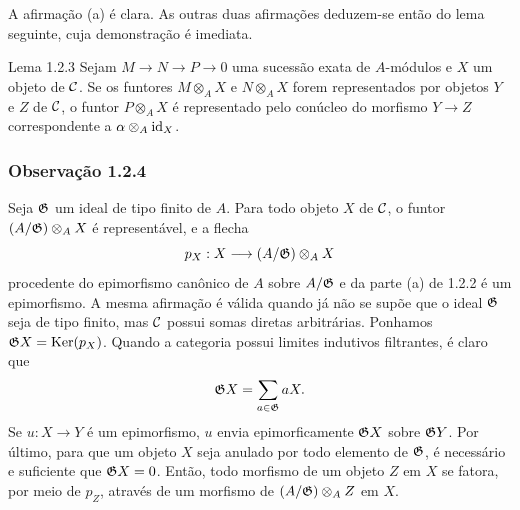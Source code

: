 \begin{prooftext}[Demonstração]
A afirmação (a) é clara. As outras duas afirmações deduzem-se então do lema seguinte, cuja demonstração é imediata.
\end{prooftext}

\begin{statement}{Lema 1.2.3}
Sejam $M\to N\to P\to0$ uma sucessão exata de $A$-módulos e $X$ um objeto de $\mathcal C$. Se os funtores $M\otimes_A X$ e $N\otimes_A X$ forem representados por objetos $Y$ e $Z$ de $\mathcal C$, o funtor $P\otimes_A X$ é representado pelo conúcleo do morfismo $Y\to Z$ correspondente a $\alpha\otimes_A\operatorname{id}_X$.
\end{statement}

\subsubsection*{Observação 1.2.4}
Seja $\mathfrak G$ um ideal de tipo finito de $A$. Para todo objeto $X$ de $\mathcal C$, o funtor $(A/\mathfrak G)\otimes_A X$ é representável, e a flecha
\[
p_X:X\longrightarrow (A/\mathfrak G)\otimes_A X
\]
procedente do epimorfismo canônico de $A$ sobre $A/\mathfrak G$ e da parte (a) de 1.2.2 é um epimorfismo. A mesma afirmação é válida quando já não se supõe que o ideal $\mathfrak G$ seja de tipo finito, mas $\mathcal C$ possui somas diretas arbitrárias. Ponhamos $\mathfrak G X=\operatorname{Ker}(p_X)$. Quando a categoria possui limites indutivos filtrantes, é claro que
\[
\mathfrak G X=\sum_{a\in\mathfrak G}aX.
\]
Se $u:X\to Y$ é um epimorfismo, $u$ envia epimorficamente $\mathfrak G X$ sobre $\mathfrak G Y$. Por último, para que um objeto $X$ seja anulado por todo elemento de $\mathfrak G$, é necessário e suficiente que $\mathfrak G X=0$. Então, todo morfismo de um objeto $Z$ em $X$ se fatora, por meio de $p_Z$, através de um morfismo de $(A/\mathfrak G)\otimes_A Z$ em $X$.
